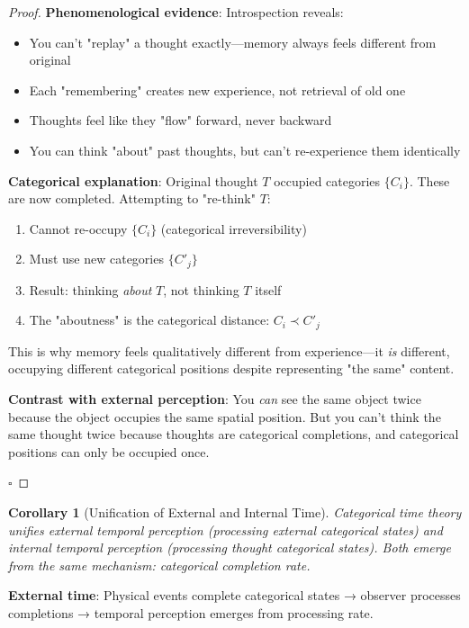 \documentclass[11pt,a4paper]{article}
\newtheorem{corollary}[theorem]{Corollary}
\begin{document}
\begin{proof}
\textbf{Phenomenological evidence}: Introspection reveals:
\begin{itemize}
\item You can't "replay" a thought exactly—memory always feels different from original
\item Each "remembering" creates new experience, not retrieval of old one  
\item Thoughts feel like they "flow" forward, never backward
\item You can think "about" past thoughts, but can't re-experience them identically
\end{itemize}

\textbf{Categorical explanation}: Original thought $T$ occupied categories $\{C_i\}$. These are now completed. Attempting to "re-think" $T$:
\begin{enumerate}
\item Cannot re-occupy $\{C_i\}$ (categorical irreversibility)
\item Must use new categories $\{C'_j\}$
\item Result: thinking \textit{about} $T$, not thinking $T$ itself
\item The "aboutness" is the categorical distance: $C_i \prec C'_j$
\end{enumerate}

This is why memory feels qualitatively different from experience—it \textit{is} different, occupying different categorical positions despite representing "the same" content.

\textbf{Contrast with external perception}: You \textit{can} see the same object twice because the object occupies the same spatial position. But you can't think the same thought twice because thoughts are categorical completions, and categorical positions can only be occupied once.

$\square$
\end{proof}

\begin{corollary}[Unification of External and Internal Time]
Categorical time theory unifies external temporal perception (processing external categorical states) and internal temporal perception (processing thought categorical states). Both emerge from the same mechanism: categorical completion rate.
\end{corollary}

\textbf{External time}: Physical events complete categorical states → observer processes completions → temporal perception emerges from processing rate.
\end{document}
